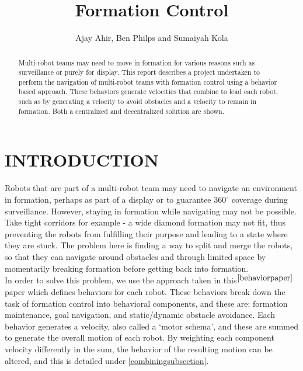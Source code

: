 \documentclass[letterpaper, 10 pt, conference]{ieeeconf}  %
\title{\LARGE \bf Formation Control}
\author{Ajay Ahir, Ben Philps and Sumaiyah Kola}
\begin{document}
\maketitle
\thispagestyle{empty}
\pagestyle{empty}

\begin{abstract}

Multi-robot teams may need to move in formation for various reasons such as surveillance or purely for display. This report describes a project undertaken to perform the navigation of multi-robot teams with formation control using a behavior based approach. These behaviors generate velocities that combine to lead each robot, such as by generating a velocity to avoid obstacles and a velocity to remain in formation. Both a centralized and decentralized solution are shown.

\end{abstract}

\section{INTRODUCTION}
\label{introductionsection}

Robots that are part of a multi-robot team may need to navigate an environment in formation, perhaps as part of a display or to guarantee 360$^{\circ}$ coverage during surveillance. However, staying in formation while navigating may not be possible. Take tight corridors for example - a wide diamond formation may not fit, thus preventing the robots from fulfilling their purpose and leading to a state where they are stuck. The problem here is finding a way to split and merge the robots, so that they can navigate around obstacles and through limited space by momentarily breaking formation before getting back into formation. \\

In order to solve this problem, we use the approach taken in this$^{\cite{behaviorpaper}}$ paper which defines behaviors for each robot. These behaviors break down the task of formation control into behavioral components, and these are: formation maintenance, goal navigation, and static/dynamic obstacle avoidance. Each behavior generates a velocity, also called a `motor schema', and these are summed to generate the overall motion of each robot. By weighting each component velocity differently in the sum, the behavior of the resulting motion can be altered, and this is detailed under \ref{combiningsubsection}. \\
\end{document}
